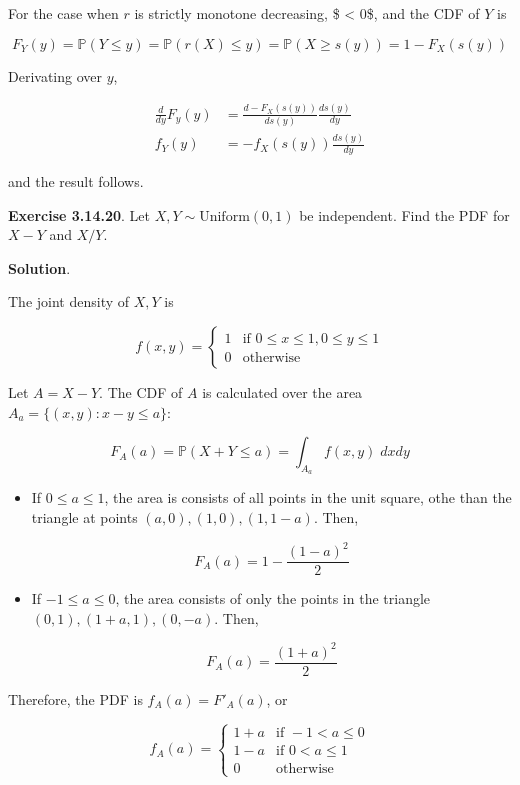 For the case when \(r\) is strictly monotone decreasing, \$
 \textless{} 0\$, and the CDF of \(Y\) is

\[ F_Y(y) = \mathbb{P}(Y \leq y) = \mathbb{P}(r(X) \leq y) = \mathbb{P}(X \geq s(y)) = 1 - F_X(s(y)) \]

Derivating over \(y\),

\begin{align}
\frac{d}{dy} F_y(y) &= \frac{d -F_X(s(y))}{d s(y)} \frac{d s(y)}{dy} \\
f_Y(y) &= -f_X(s(y)) \frac{d s(y)}{dy}
\end{align}

and the result follows.

\textbf{Exercise 3.14.20}. Let \(X, Y \sim \text{Uniform}(0, 1)\) be
independent. Find the PDF for \(X - Y\) and \(X / Y\).

\textbf{Solution}.

The joint density of \(X, Y\) is

\[ 
f(x, y) = \begin{cases}
1 &\text{if } 0 \leq x \leq 1, 0 \leq y \leq 1 \\
0 &\text{otherwise}
\end{cases}
\]

Let \(A = X - Y\). The CDF of \(A\) is calculated over the area
\(A_a = \{ (x, y) : x - y \leq a \}\):

\[ F_A(a) = \mathbb{P}(X + Y \leq a) = \int_{A_a} f(x, y)\; dx dy \]

\begin{itemize}
\item
  If \(0 \leq a \leq 1\), the area is consists of all points in the unit
  square, othe than the triangle at points
  \((a, 0), (1, 0), (1, 1 - a)\). Then,

  \[ F_A(a) = 1 - \frac{(1 - a)^2}{2} \]
\item
  If \(-1 \leq a \leq 0\), the area consists of only the points in the
  triangle \((0, 1), (1 + a, 1), (0, -a)\). Then,

  \[ F_A(a) = \frac{(1 + a)^2}{2} \]
\end{itemize}

Therefore, the PDF is \(f_A(a) = F'_A(a)\), or

\[ 
f_A(a) = \begin{cases}
1 + a &\text{if } -1 < a \leq 0 \\
1 - a &\text{if } 0 < a \leq 1 \\
0 &\text{otherwise}
\end{cases} 
\]

